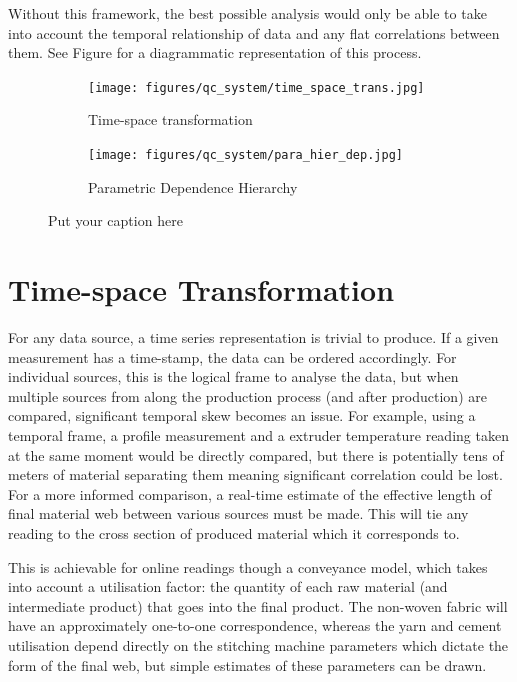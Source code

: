 \documentclass[12pt]{report}
\begin{document}
Without this framework, the best possible analysis would only be able to take into account the temporal relationship of data and any flat correlations between them. See Figure for a diagrammatic representation of this process.
\begin{figure}[ht]
\begin{subfigure}{\textwidth}
  \centering
  \texttt{[image: figures/qc\_system/time\_space\_trans.jpg]}  
  \caption{Time-space transformation}
  \label{fig:sub-first}
\end{subfigure}
\newline
\begin{subfigure}{\textwidth}
  \centering
  \texttt{[image: figures/qc\_system/para\_hier\_dep.jpg]}  
  \caption{Parametric Dependence Hierarchy}
  \label{fig:sub-second}
\end{subfigure}
\caption{Put your caption here}
\label{fig:qc_framework}
\end{figure}

\section{Time-space Transformation}

For any data source, a time series representation is trivial to produce. If a given measurement has a time-stamp, the data can be ordered accordingly. For individual sources, this is the logical frame to analyse the data, but when multiple sources from along the production process (and after production) are compared, significant temporal skew becomes an issue. For example, using a temporal frame, a profile measurement and a extruder temperature reading taken at the same moment would be directly compared, but there is potentially tens of meters of material separating them meaning significant correlation could be lost. For a more informed comparison, a real-time estimate of the effective length of final material web between various sources must be made. This will tie any reading to the cross section of produced material which it corresponds to. 

This is achievable for online readings though a conveyance model, which takes into account a utilisation factor: the quantity of each raw material (and intermediate product) that goes into the final product. The non-woven fabric will have an approximately one-to-one correspondence, whereas the yarn and cement utilisation depend directly on the stitching machine parameters which dictate the form of the final web, but simple estimates of these parameters can be drawn. 
\end{document}
